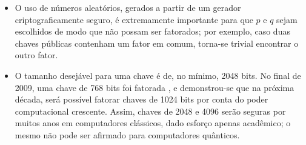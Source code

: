 \documentclass{article}
\begin{document}
\begin{itemize}
\item O uso de números aleatórios, gerados a partir de um gerador
criptograficamente seguro, é extremamente importante para que $p$ e $q$ sejam
escolhidos de modo que não possam ser fatorados; por exemplo, caso duas chaves
públicas contenham um fator em comum, torna-se trivial encontrar o outro fator.

\item O tamanho desejável para uma chave é de, no mínimo, 2048 bits. No final
de 2009, uma chave de 768 bits foi fatorada
\cite{Kleinjung:2010:FRM:1881412.1881436}, e demonstrou-se que na próxima
década, será possível fatorar chaves de 1024 bits por conta do poder
computacional crescente. Assim, chaves de 2048 e 4096 serão seguras por muitos
anos em computadores clássicos, dado esforço apenas acadêmico; o mesmo não pode
ser afirmado para computadores quânticos.




\end{itemize}
\end{document}
